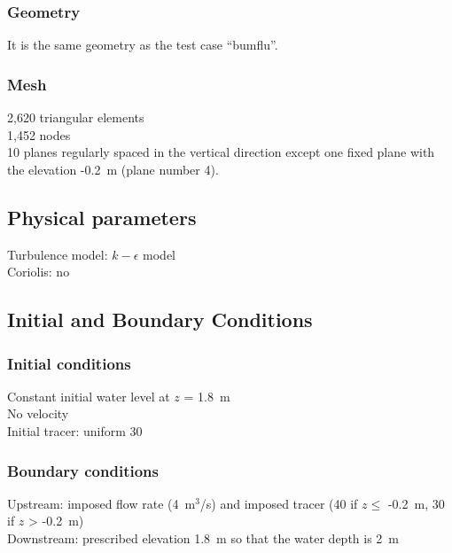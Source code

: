 \subsubsection{Geometry}
%
It is the same geometry as the  test case ``bumflu''.
%
\subsubsection{Mesh}
%
2,620 triangular elements\\
1,452 nodes\\
10 planes regularly spaced in the vertical direction except one fixed
plane with the elevation -0.2~m (plane number 4).
%
%
%
\subsection{Physical parameters}
%
Turbulence model: $k-\epsilon$ model\\
Coriolis: no
%
%
%
%
%
%
\subsection{Initial and Boundary Conditions}
%
\subsubsection{Initial conditions}
%
Constant initial water level at $z$ = 1.8~m\\
No velocity\\
Initial tracer: uniform 30
%
\subsubsection{Boundary conditions}
%
Upstream: imposed flow rate (4~m$^3$/s) and imposed tracer
(40 if $z \leq$ -0.2~m, 30 if $z$ > -0.2~m)\\
Downstream: prescribed elevation 1.8~m so that the water depth is 2~m
%
